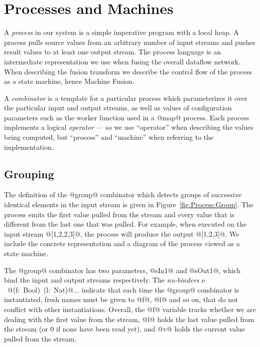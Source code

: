 
\section{Processes and Machines}
\label{s:Processes}

A \emph{process} in our system is a simple imperative program with a local heap. A process pulls source values from an arbitrary number of input streams and pushes result values to at least one output stream. The process language is an intermediate representation we use when fusing the overall dataflow network. When describing the fusion transform we describe the control flow of the process as a state machine, hence Machine Fusion. 

A \emph{combinator} is a template for a particular process which parameterizes it over the particular input and output streams, as well as values of configuration parameters such as the worker function used in a @map@ process. Each process implements a logical \emph{operator} --- so we use ``operator'' when describing the values being computed, but ``process'' and ``machine'' when referring to the implementation. 


\subsection{Grouping}

The definition of the @group@ combinator which detects groups of successive identical elements in the input stream is given in Figure~\ref{fig:Process:Group}. The process emits the first value pulled from the stream and every value that is different from the last one that was pulled. For example, when executed on the input stream @[1,2,2,3]@, the process will produce the output @[1,2,3]@. We include the concrete representation and a diagram of the process viewed as a state machine.

The @group@ combinator has two parameters, @sIn1@ and @sOut1@, which bind the input and output streams respectively. The \emph{nu-binders} \mbox{$\nu$ @(f: Bool) (l: Nat)@...} indicate that each time the @group@ combinator is instantiated, fresh names must be given to @f@, @l@ and so on, that do not conflict with other instantiations. Overall, the @f@ variable tracks whether we are dealing with the first value from the stream, @l@ holds the last value pulled from the stream (or 0 if none have been read yet), and @v@ holds the current value pulled from the stream. 

